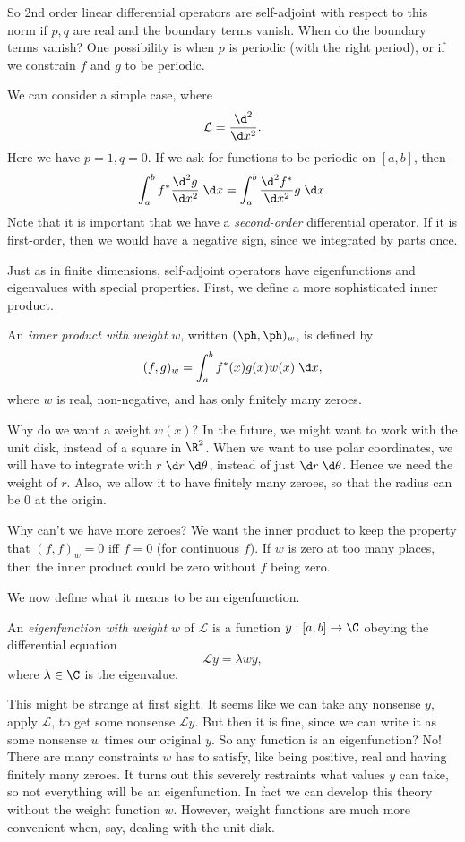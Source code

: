 \documentclass[a4paper]{article}
\begin{document}
So 2nd order linear differential operators are self-adjoint with respect to this norm if $p, q$ are real and the boundary terms vanish. When do the boundary terms vanish? One possibility is when $p$ is periodic (with the right period), or if we constrain $f$ and $g$ to be periodic.

\begin{eg}
  We can consider a simple case, where
  \[
    \mathcal{L} = \frac{\d^2}{\d x^2}.
  \]
  Here we have $p = 1, q = 0$. If we ask for functions to be periodic on $[a, b]$, then
  \[
    \int_a^b f^*\frac{\d^2 g}{\d x^2}\;\d x = \int_a^b \frac{\d^2 f^*}{\d x^2}g\;\d x.
  \]
  Note that it is important that we have a \emph{second-order} differential operator. If it is first-order, then we would have a negative sign, since we integrated by parts once.
\end{eg}

Just as in finite dimensions, self-adjoint operators have eigenfunctions and eigenvalues with special properties. First, we define a more sophisticated inner product.
\begin{defi}
  An \emph{inner product with weight} $w$, written $(\ph, \ph)_w$, is defined by
  \[
    (f, g)_w = \int_a^b f^*(x) g(x) w(x)\;\d x,
  \]
  where $w$ is real, non-negative, and has only finitely many zeroes.
\end{defi}
Why do we want a weight $w(x)$? In the future, we might want to work with the unit disk, instead of a square in $\R^2$. When we want to use polar coordinates, we will have to integrate with $r\;\d r\;\d \theta$, instead of just $\d r\;\d \theta$. Hence we need the weight of $r$. Also, we allow it to have finitely many zeroes, so that the radius can be $0$ at the origin.

Why can't we have more zeroes? We want the inner product to keep the property that $(f, f)_w = 0$ iff $f = 0$ (for continuous $f$). If $w$ is zero at too many places, then the inner product could be zero without $f$ being zero.

We now define what it means to be an eigenfunction.
\begin{defi}
  An \emph{eigenfunction with weight} $w$ of $\mathcal{L}$ is a function $y: [a, b] \to \C$ obeying the differential equation
  \[
    \mathcal{L} y = \lambda w y,
  \]
  where $\lambda\in \C$ is the eigenvalue.
\end{defi}
This might be strange at first sight. It seems like we can take any nonsense $y$, apply $\mathcal{L}$, to get some nonsense $\mathcal{L} y$. But then it is fine, since we can write it as some nonsense $w$ times our original $y$. So any function is an eigenfunction? No! There are many constraints $w$ has to satisfy, like being positive, real and having finitely many zeroes. It turns out this severely restraints what values $y$ can take, so not everything will be an eigenfunction. In fact we can develop this theory without the weight function $w$. However, weight functions are much more convenient when, say, dealing with the unit disk.
\end{document}
